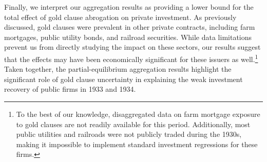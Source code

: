 Finally, we interpret our aggregation results as providing a lower bound for the total effect of gold clause abrogation on private investment. As previously discussed, gold clauses were prevalent in other private contracts, including farm mortgages, public utility bonds, and railroad securities. While data limitations prevent us from directly studying the impact on these sectors, our results suggest that the effects may have been economically significant for these issuers as well.\footnote{To the best of our knowledge, disaggregated data on farm mortgage exposure to gold clauses are not readily available for this period. Additionally, most public utilities and railroads were not publicly traded during the 1930s, making it impossible to implement standard investment regressions for these firms.} Taken together, the partial-equilibrium aggregation results highlight the significant role of gold clause uncertainty in explaining the weak investment recovery of public firms in 1933 and 1934.
